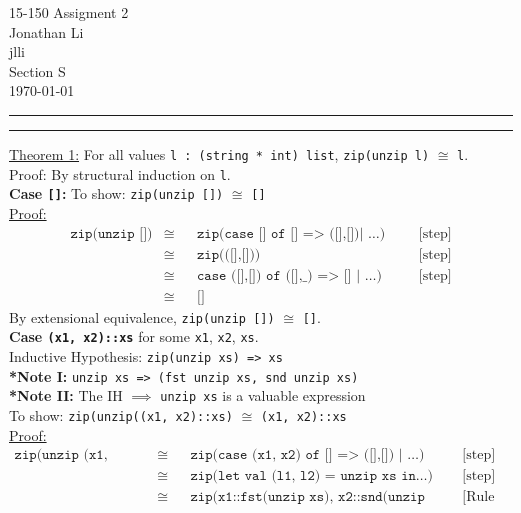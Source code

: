 \documentclass[11pt]{article}
\newcounter{questionCounter}
\newcounter{partCounter}[questionCounter]
\newenvironment{question}[2][\arabic{questionCounter}]{%
    \setcounter{partCounter}{0}%
    \vspace{.25in} \hrule \vspace{0.5em}%
        \noindent{\bf #2}%
    \vspace{0.8em} \hrule \vspace{.10in}%
    \addtocounter{questionCounter}{1}%
}{}
\newcommand{\myclass}{15-150}
\newcommand{\myname}{Jonathan Li}
\newcommand{\myandrew}{jlli}
\newcommand{\myhwname}{Assigment 2}
\newcommand{\myrecitation}{Section S}
\begin{document}
\thispagestyle{plain}

\begin{center}
{\Large \myclass{} \myhwname} \\
\myname \\
\myandrew \\
\myrecitation \\
\today
\end{center}

\begin{question}{Task 2.1}
\underline{Theorem 1:} For all values \verb!l : (string * int) list!, \verb!zip(unzip l)! $\cong$ \verb!l!.\\
Proof: By structural induction on \verb!l!.\\
\textbf{Case \texttt{[]}:} To show: \verb!zip(unzip [])! $\cong$ \verb![]!\\
\underline{Proof:}
\begin{align*}
    \texttt{zip(unzip [])} & \cong && \texttt{zip(case [] of [] => ([],[])| }\dots\texttt{)} &&& \text{[step]}\\
    & \cong && \texttt{zip(([],[]))} &&& \text{[step]}\\
    & \cong && \texttt{case ([],[]) of ([],\char`_) => [] | }\dots\texttt{)} &&& \text{[step]}\\
    & \cong && \texttt{[]}
\end{align*}
By extensional equivalence, \verb!zip(unzip [])! $\cong$ \verb![]!.\\
\textbf{Case \texttt{(x1, x2)::xs}} for some \verb!x1!, \verb!x2!, \verb!xs!.\\
Inductive Hypothesis: \verb!zip(unzip xs) => xs!\\
\hspace{1cm} \textbf{*Note I:} \verb!unzip xs => (fst unzip xs, snd unzip xs)!\\
\hspace{1cm} \textbf{*Note II:} The IH $\implies$ \verb!unzip xs! is a valuable expression\\
\qquad To show: \verb!zip(unzip((x1, x2)::xs)! $\cong$ \verb!(x1, x2)::xs!\\
\underline{Proof:}
\begin{align*}
    \texttt{zip(unzip (x1, x2)::xs)} &\cong && \texttt{zip(case (x1, x2) of [] => ([],[]) | }\dots\texttt{)} &&& \text{[step]}\\
    &\cong && \texttt{zip(let val (l1, l2) = unzip xs in}\dots\texttt{)} &&& \text{[step]}\\
    &\cong && \texttt{zip(x1::fst(unzip xs), x2::snd(unzip xs))} &&& \text{[Rule 1,}\\

\end{align*}
\end{question}
\end{document}
